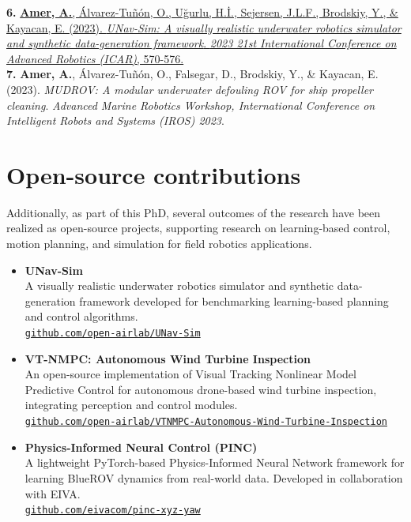 \textbf{6.} \href{https://ieeexplore.ieee.org/abstract/document/10406819}{\textbf{Amer, A.}, Álvarez-Tuñón, O., Uğurlu, H.İ., Sejersen, J.L.F., Brodskiy, Y., \& Kayacan, E. (2023). \textit{UNav-Sim: A visually realistic underwater robotics simulator and synthetic data-generation framework}. \textit{2023 21st International Conference on Advanced Robotics (ICAR)}, 570-576.}\\[0.8em]

\textbf{7.} \textbf{Amer, A.}, Álvarez-Tuñón, O., Falsegar, D., Brodskiy, Y., \& Kayacan, E. (2023). \textit{MUDROV: A modular underwater defouling ROV for ship propeller cleaning}. \textit{Advanced Marine Robotics Workshop, International Conference on Intelligent Robots and Systems (IROS) 2023}.



\section*{Open-source contributions}

Additionally, as part of this PhD, several outcomes of the research have been realized as open-source projects, supporting research on learning-based control, motion planning, and simulation for field robotics applications.



\begin{itemize}
    \item \textbf{UNav-Sim} \\
    A visually realistic underwater robotics simulator and synthetic data-generation framework developed for benchmarking learning-based planning and control algorithms.\\
    \href{https://github.com/open-airlab/UNav-Sim}{\texttt{github.com/open-airlab/UNav-Sim}}

    \item \textbf{VT-NMPC: Autonomous Wind Turbine Inspection} \\
    An open-source implementation of Visual Tracking Nonlinear Model Predictive Control for autonomous drone-based wind turbine inspection, integrating perception and control modules.\\
    \href{https://github.com/open-airlab/VTNMPC-Autonomous-Wind-Turbine-Inspection}{\texttt{github.com/open-airlab/VTNMPC-Autonomous-Wind-Turbine-Inspection}}

    \item \textbf{Physics-Informed Neural Control (PINC)} \\
    A lightweight PyTorch-based Physics-Informed Neural Network framework for learning BlueROV dynamics from real-world data. Developed in collaboration with EIVA.\\
    \href{https://github.com/eivacom/pinc-xyz-yaw}{\texttt{github.com/eivacom/pinc-xyz-yaw}}
\end{itemize}





